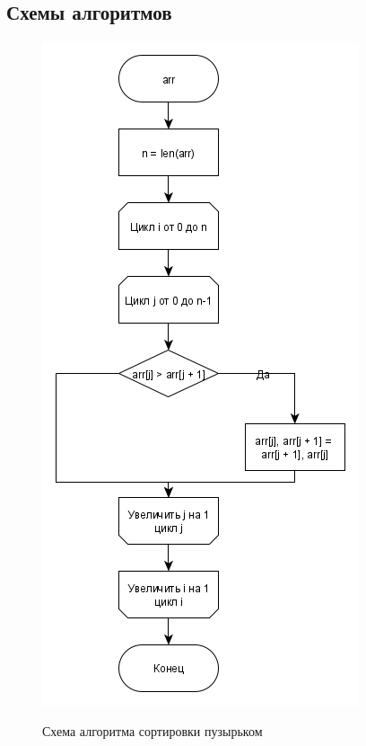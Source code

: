 \documentclass[a4paper, 14pt]{article}
\begin{document}
        \subsection{Схемы алгоритмов}
        	\begin{figure}[h]
        	\begin{center}
        		{\includegraphics[scale=0.48]{bubble_scheme}}
        		\caption{Схема алгоритма сортировки пузырьком}
        	\end{center}
        \end{figure}
        \newpage
\end{document}
